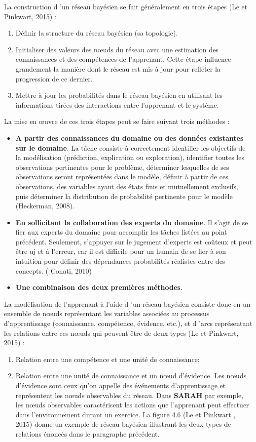 La construction d 'un réseau bayésien se fait généralement en trois étapes (Le et Pinkwart, 2015) : 
\begin{enumerate}
\item  Définir la structure du réseau bayésien (sa topologie). 
\item  Initialiser des valeurs des nœuds du réseau avec une estimation des connaissances et des compétences de l'apprenant. Cette étape influence grandement la manière dont le réseau est mis à jour pour refléter la progression de ce dernier.
\item Mettre à jour les probabilités dans le réseau bayésien en utilisant les informations tirées des interactions entre l'apprenant et le système.
\end{enumerate}
La mise en œuvre de ces trois étapes peut se faire suivant trois méthodes : 

\begin{itemize}
\item \textbf{A partir des connaissances du domaine ou des données existantes sur le domaine}. La tâche consiste à correctement identifier les objectifs de la modélisation (prédiction, explication ou exploration), identifier toutes les observations pertinentes pour le problème, déterminer lesquelles de ses observations seront représentées dans le modèle, définir à partir de ces observations, des variables ayant des états finis et mutuellement exclusifs, puis déterminer la distribution de probabilité pertinente pour le modèle (Heckerman, 2008).
\item \textbf{En sollicitant la collaboration des experts du domaine}. Il s'agit de se fier aux experts du domaine pour accomplir les tâches listées au point précédent. Seulement, s'appuyer sur le jugement d'experts est coûteux et peut être uj et à l'erreur, car il est difficile pour un humain de se fier à son intuition pour définir des dépendances probabilités réalistes entre des concepts. ( Conati, 2010) 
\item \textbf{Une combinaison des deux premières méthodes}.
\end{itemize}

 La modélisation de l'apprenant à l'aide d 'un réseau bayésien consiste donc en un ensemble de nœuds représentant les variables associées au processus d'apprentissage (connaissance, compétence, évidence, etc.), et d 'arcs représentant les relations entre ces nœuds qui peuvent être de deux types (Le et Pinkwart, 2015) : 
\begin{enumerate}
\item Relation entre une compétence et une unité de connaissance;
\item Relation entre une unité de connaissance et un nœud d'évidence. Les nœuds d'évidence sont ceux qu'on appelle des événements d'apprentissage et représentent les nœuds observables du réseau. Dans  \textbf{SARAH} par exemple, les nœuds observables caractérisent les actions que l'apprenant peut effectuer dans l'environnement durant un exercice. La figure 4.6 (Le et Pinkwart , 2015)  donne un exemple de réseau bayésien illustrant les deux types de relations énoncés dans le paragraphe précédent.\\\
\end{enumerate}

